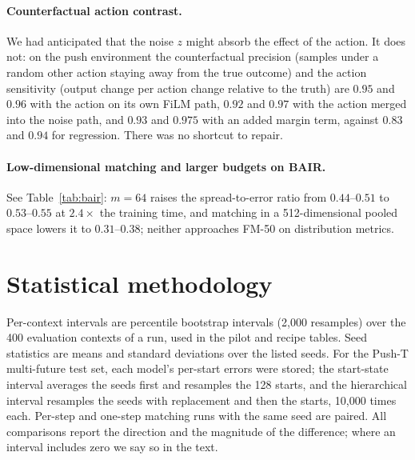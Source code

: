 \paragraph{Counterfactual action contrast.}
We had anticipated that the noise $z$ might absorb the effect of the action. It does not: on the push environment the counterfactual precision (samples under a random other action staying away from the true outcome) and the action sensitivity (output change per action change relative to the truth) are $0.95$ and $0.96$ with the action on its own FiLM path, $0.92$ and $0.97$ with the action merged into the noise path, and $0.93$ and $0.975$ with an added margin term, against $0.83$ and $0.94$ for regression. There was no shortcut to repair.

\paragraph{Low-dimensional matching and larger budgets on BAIR.}
See Table~\ref{tab:bair}: $m{=}64$ raises the spread-to-error ratio from $0.44$--$0.51$ to $0.53$--$0.55$ at $2.4\times$ the training time, and matching in a 512-dimensional pooled space lowers it to $0.31$--$0.38$; neither approaches FM-50 on distribution metrics.

\section{Statistical methodology}
\label{app:stats}
Per-context intervals are percentile bootstrap intervals (2{,}000 resamples) over the 400 evaluation contexts of a run, used in the pilot and recipe tables. Seed statistics are means and standard deviations over the listed seeds. For the Push-T multi-future test set, each model's per-start errors were stored; the start-state interval averages the seeds first and resamples the 128 starts, and the hierarchical interval resamples the seeds with replacement and then the starts, 10{,}000 times each. Per-step and one-step matching runs with the same seed are paired. All comparisons report the direction and the magnitude of the difference; where an interval includes zero we say so in the text.

